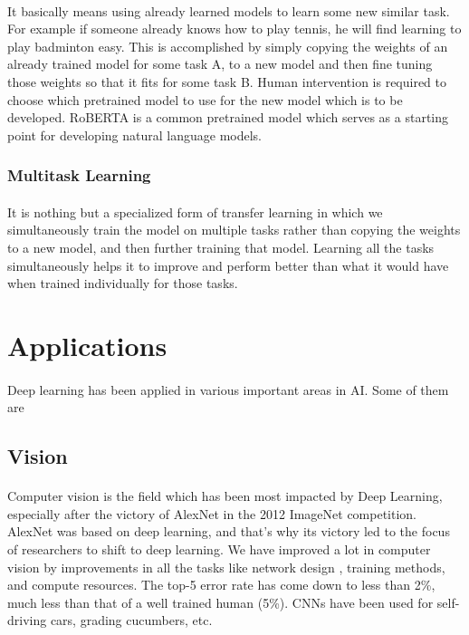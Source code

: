 \documentclass{article}
\begin{document}
              \paragraph{} It basically means using already learned models to learn some new similar task. For example if someone already knows how to play tennis, he will find learning to play badminton easy. This is accomplished by simply copying the weights of an already trained model for some task A, to a new model and then fine tuning those weights so that it fits for some task B. Human intervention is required to choose which pretrained model to use for the new model which is to be developed. RoBERTA is a common pretrained model which serves as a starting point for developing natural language models.
    \subsubsection{Multitask Learning}
              \paragraph{} It is nothing but a specialized form of transfer learning in which we simultaneously train the model on multiple tasks rather than copying the weights to a new model, and then further training that model. Learning all the tasks simultaneously helps it to improve and perform better than what it would have when trained individually for those tasks.

\section{Applications}
              \paragraph{} Deep learning has been applied in various important areas in AI. Some of them are
              \subsection{Vision}
                \paragraph{} Computer vision is the field which has been most impacted by Deep Learning, especially after the victory of AlexNet in the 2012 ImageNet competition. AlexNet was based on deep learning, and that’s why its victory led to the focus of researchers to shift to deep learning. We have improved a lot in computer vision by improvements in all the tasks like network design , training methods, and compute resources. The top-5 error rate has come down to less than 2\%, much less than that of a well trained human (5\%). CNNs have been used for self-driving cars, grading cucumbers, etc.
\end{document}
